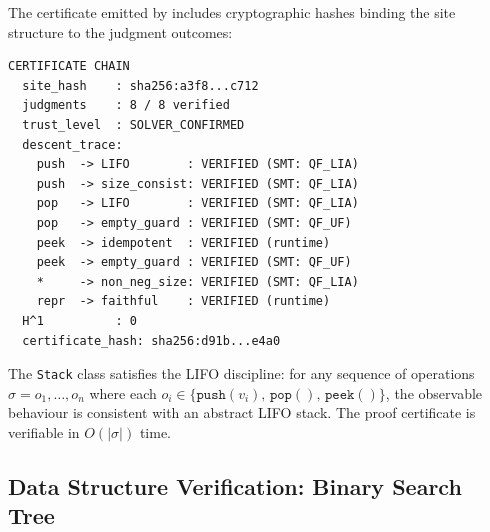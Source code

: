 The certificate emitted by \JuGeo{} includes cryptographic hashes
binding the site structure to the judgment outcomes:

\begin{lstlisting}[style=jugeo-output,caption={Certificate chain for the Stack class.},label={lst:cert-stack}]
CERTIFICATE CHAIN
  site_hash    : sha256:a3f8...c712
  judgments    : 8 / 8 verified
  trust_level  : SOLVER_CONFIRMED
  descent_trace:
    push  -> LIFO        : VERIFIED (SMT: QF_LIA)
    push  -> size_consist: VERIFIED (SMT: QF_LIA)
    pop   -> LIFO        : VERIFIED (SMT: QF_LIA)
    pop   -> empty_guard : VERIFIED (SMT: QF_UF)
    peek  -> idempotent  : VERIFIED (runtime)
    peek  -> empty_guard : VERIFIED (SMT: QF_UF)
    *     -> non_neg_size: VERIFIED (SMT: QF_LIA)
    repr  -> faithful    : VERIFIED (runtime)
  H^1          : 0
  certificate_hash: sha256:d91b...e4a0
\end{lstlisting}

\begin{theorem}\label{thm:stack-lifo}
The \texttt{Stack} class satisfies the LIFO discipline: for any
sequence of operations
$\sigma = o_1,\ldots,o_n$ where each $o_i \in \{\texttt{push}(v_i),\,
\texttt{pop}(),\, \texttt{peek}()\}$,
the observable behaviour is consistent with an abstract LIFO stack.
The proof certificate is verifiable in $O(|\sigma|)$ time.
\end{theorem}


\subsection{Data Structure Verification: Binary Search Tree}%
\label{sec:app-bst}

